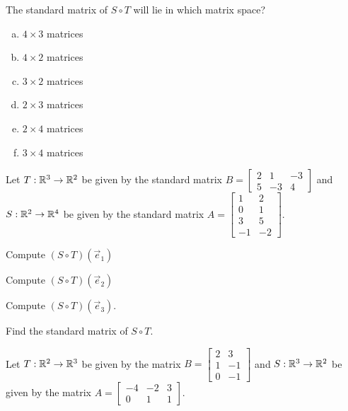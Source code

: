 \begin{applicationActivities}
\begin{activity}{2}
The standard matrix of $S \circ T$ will lie in which matrix space?
\begin{enumerate}[(a)]
\item $4 \times 3$ matrices
\item $4 \times 2$ matrices
\item $3 \times 2$ matrices
\item $2 \times 3$ matrices
\item $2 \times 4$ matrices
\item $3 \times 4$ matrices
\end{enumerate}
\end{activity}

\begin{activity}{15}
Let $T: \mathbb{R}^3 \rightarrow \mathbb{R}^2$ be given by the standard matrix $B=\begin{bmatrix} 2 & 1 & -3 \\ 5 & -3 & 4 \end{bmatrix}$ and $S: \mathbb{R}^2 \rightarrow \mathbb{R}^4$ be given by the standard matrix $A=\begin{bmatrix} 1 & 2 \\ 0 & 1 \\ 3 & 5 \\ -1 & -2 \end{bmatrix}$.

\begin{subactivity}
Compute $(S \circ T)(\vec{e}_1)$
\end{subactivity}
\begin{subactivity}
Compute  $(S \circ T)(\vec{e}_2)$
\end{subactivity}
\begin{subactivity}
Compute $(S \circ T)(\vec{e}_3)$.
\end{subactivity}
\begin{subactivity}
Find the standard matrix of $S \circ T$.
\end{subactivity}
\end{activity}


\begin{activity}{2}
Let $T: \mathbb{R}^2 \rightarrow \mathbb{R}^3$ be given by the matrix $B=\begin{bmatrix} 2 & 3 \\ 1 & -1 \\ 0 & -1 \end{bmatrix}$ and $S: \mathbb{R}^3 \rightarrow \mathbb{R}^2$ be given by the matrix $A=\begin{bmatrix} -4 & -2 & 3 \\ 0 & 1 & 1 \end{bmatrix}$.


\end{activity}
\end{applicationActivities}
